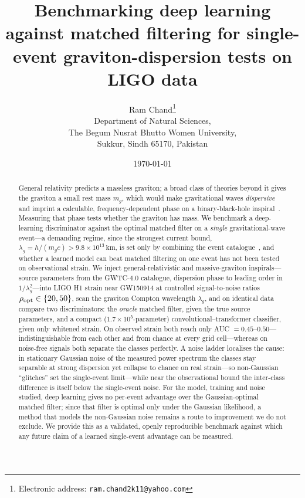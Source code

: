 \documentclass[11pt,a4paper]{article}
\newcommand{\km}{\text{km}}
\newcommand{\mg}{m_{g}}
\newcommand{\lamg}{\lambda_{g}}
\begin{document}
\title{Benchmarking deep learning against matched filtering for
single-event graviton-dispersion tests on LIGO data}

\author{Ram Chand\thanks{Electronic address: \texttt{ram.chand2k11@yahoo.com}}\\
Department of Natural Sciences,\\
The Begum Nusrat Bhutto Women University,\\
Sukkur, Sindh 65170, Pakistan}

\date{\today}

\maketitle

\begin{abstract}
General relativity predicts a massless graviton; a broad class of
theories beyond it gives the graviton a small rest mass $\mg$, which
would make gravitational waves \emph{dispersive} and imprint a
calculable, frequency-dependent phase on a binary-black-hole
inspiral~\cite{Will1998,MirshekariYunesWill2012}. Measuring that phase
tests whether the graviton has mass. We benchmark a deep-learning
discriminator against the optimal matched filter on a \emph{single}
gravitational-wave event---a demanding regime, since the strongest
current bound, $\lamg=h/(\mg c)>9.8\times 10^{13}\,\km$, is set only
by combining the event catalogue~\cite{TestGR_arXiv2112}, and
whether a learned model can beat matched filtering on one event has not
been tested on observational strain. We inject general-relativistic and
massive-graviton inspirals---source parameters from the GWTC-4.0
catalogue, dispersion phase to leading order in $1/\lamg^{2}$---into LIGO
H1 strain near GW150914 at controlled signal-to-noise ratios
$\rho_{\rm opt}\in\{20,50\}$, scan the graviton Compton wavelength
$\lamg$, and on identical data compare two discriminators: the
\emph{oracle} matched filter, given the true source parameters, and a
compact ($1.7\times 10^{5}$-parameter) convolutional--transformer
classifier, given only whitened strain. On observed strain both reach
only AUC $=0.45$--$0.50$---indistinguishable from each other and from
chance at every grid cell---whereas on noise-free signals both separate
the classes perfectly. A noise ladder localises the cause: in stationary
Gaussian noise of the measured power spectrum the classes stay separable
at strong dispersion yet collapse to chance on real strain---so
non-Gaussian ``glitches'' set the single-event limit---while near the
observational bound the inter-class difference is itself below the
single-event noise. For the model, training and noise studied, deep
learning gives no per-event advantage over the Gaussian-optimal matched
filter; since that filter is optimal only under the Gaussian likelihood, a
method that models the non-Gaussian noise remains a route to improvement we
do not exclude. We provide this as a validated, openly reproducible
benchmark against which any future claim of a learned single-event
advantage can be measured.
\end{abstract}
\end{document}
